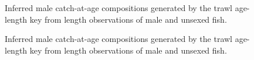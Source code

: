 \documentclass[11pt]{book}
\begin{document}
\newpage
\begin{figure}[htb]

{\centering {} 

}

\caption{Inferred male catch-at-age compositions generated by the trawl age-length key from length observations of male and unsexed fish.}\label{fig:unnamed-chunk-7}
\end{figure}
\newpage
\begin{figure}[htb]

{\centering {} 

}

\caption{Inferred male catch-at-age compositions generated by the trawl age-length key from length observations of male and unsexed fish.}\label{fig:unnamed-chunk-8}
\end{figure}
\end{document}
